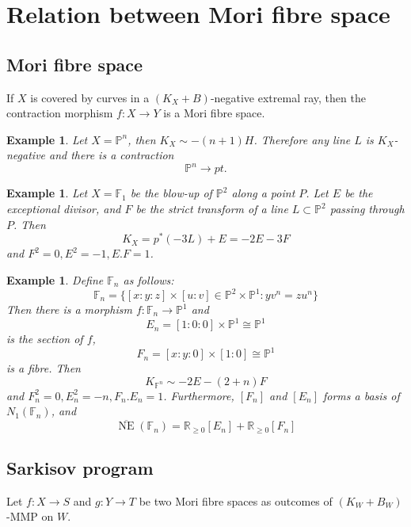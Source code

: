\documentclass{article}
\newtheorem{exa}[defn]{Example}
\begin{document}
\section{Relation between Mori fibre space}

\subsection{Mori fibre space}
If $X$ is covered by curves in a $(K_{X}+B)$-negative extremal ray, then the contraction morphism $f:X \to Y$ is a Mori fibre space.
\begin{exa}
	Let $X=\mathbb{P}^{n}$, then $K_{X}\sim -(n+1)H$. Therefore any line $L$ is $K_{X}$-negative and there is a contraction
	\[
		\mathbb{P}^{n}\to pt.
	\]
\end{exa}

\begin{exa}
	Let $X=\mathbb{F}_{1}$ be the blow-up of $\mathbb{P}^{2}$ along a point $P$. Let $E$ be the exceptional divisor, and $F$ be the strict transform of a line $L \subset \mathbb{P}^{2}$ passing through $P$. Then
	\[
		K_{X}=p^{*}(-3L)+E= -2E-3F
	\]
	and $F^2=0,E^2=-1,E.F=1$.
\end{exa}

\begin{exa}
	Define $\mathbb{F}_{n}$ as follows:
	\[
		\mathbb{F}_{n}=\{[x:y:z]\times[u:v]\in \mathbb{P}^{2}\times \mathbb{P}^{1}: yv^{n}=zu^{n}\}
	\]
	Then there is a morphism $f:\mathbb{F}_{n}\to \mathbb{P}^{1}$ and
	\[
		E_{n}=[1:0:0]\times \mathbb{P}^{1} \cong \mathbb{P}^{1}
	\]
	is the section of $f$,
	\[
		F_{n}= [x:y:0]\times [1:0] \cong \mathbb{P}^{1}
	\]
	is a fibre. Then
	\[
		K_{\mathbb{F}^{n}}\sim -2E-(2+n)F
	\]
	and $F_{n}^2=0,E_{n}^2=-n,F_{n}.E_{n}=1$. Furthermore, $[F_{n}]$ and $[E_{n}]$ forms a basis of $N_{1}(\mathbb{F}_{n})$, and
	\[
		\overline{\operatorname{NE}}(\mathbb{F}_{n})=\mathbb{R}_{\geqslant 0}[E_{n}]+\mathbb{R}_{\geqslant 0}[F_{n}]
	\]

\end{exa}

\subsection{Sarkisov program}
Let $f:X\to S$ and $g:Y\to T$ be two Mori fibre spaces as outcomes of $(K_{W}+B_{W})$-MMP on $W$.
\end{document}
